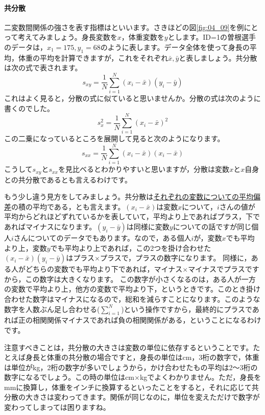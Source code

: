 \documentclass{ltjbook}
\begin{document}
\paragraph{共分散}二変数間関係の強さを表す指標はといいます。さきほどの図\ref{fig:04_09}を例にとって考えてみましょう。身長変数を$x$，体重変数を$y$とします。ID=1の曽根選手のデータは，$x_1= 175,y_1=68$のように表します。データ全体を使って身長の平均，体重の平均を計算できますが，これをそれぞれ$\bar{x},\bar{y}$と表しましょう。共分散は次の式で表されます。
\[ s_{xy} = \frac{1}{N}\sum_{i=1}^N (x_i - \bar{x})(y_i - \bar{y}) \label{ref:covariance}\]
これはよく見ると，分散の式に似ていると思いませんか。分散の式は次のように書くのでした。
\[ s_{x}^2 = \frac{1}{N}\sum_{i=1}^N (x_i - \bar{x})^2 \]
この二乗になっているところを展開して見ると次のようになります。
\[ s_{xx} = \frac{1}{N}\sum_{i=1}^N (x_i - \bar{x})(x_i - \bar{x}) \]
こうして$s_{xy}$と$s_{xx}$を見比べるとわかりやすいと思いますが，分散は変数$x$と$x$自身との共分散であるとも言えるわけです。

もう少し違う見方をしてみましょう。共分散は\uline{それぞれの変数についての平均偏差}の積の平均である，とも言えます。$(x_i - \bar{x})$は変数$x$について，$i$さんの値が平均からどれほどずれているかを表していて，平均より上であればプラス，下であればマイナスになります。$(y_i - \bar{y})$は同様に変数$y$についての話ですが同じ個人$i$さんについてのデータでもあります。なので，ある個人$i$が，変数$x$でも平均より上，変数$y$でも平均より上であれば，この2つを掛け合わせた$(x_i - \bar{x})(y_i - \bar{y})$はプラス$\times$プラスで，プラスの数字になります。
同様に，ある人がどちらの変数でも平均より下であれば，マイナス$\times$マイナスでプラスですから，この数字は大きくなります。
この数字が小さくなるのは，ある人が一方の変数で平均より上，他方の変数で平均より下，というときです。このとき掛け合わせた数字はマイナスになるので，総和を減らすことになります。このような数字を人数ぶん足し合わせる($\sum_{i=1}^N$)という操作ですから，最終的にプラスであれば正の相関関係マイナスであれば負の相関関係がある，ということになるわけです。

注意すべきことは，共分散の大きさは変数の単位に依存するということです。たとえば身長と体重の共分散の場合ですと，身長の単位はcm，3桁の数字で，体重は単位がkg，2桁の数字が多いでしょうから，かけ合わせたもの平均は2〜3桁の数字になるでしょう。この時の単位はcm$\times$kgでよくわかりません。ただ，身長をmmに換算し，体重をインチに換算するといったことをすると，それに応じて共分散の大きさは変わってきます。関係が同じなのに，単位を変えただけで数字が変わってしまっては困りますね。
\end{document}
